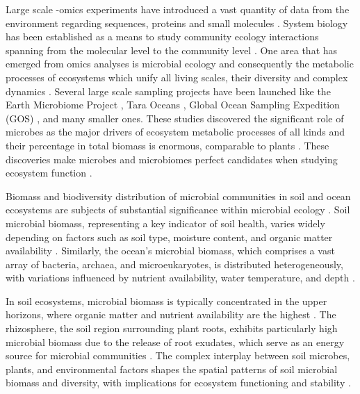 Large scale -omics experiments have introduced a vast quantity of data from the
environment regarding sequences, proteins and small molecules \parencite{shaffer2022Standardized}.
System biology has been established as a means to study community ecology interactions spanning
from the molecular level to the community level \parencite{raes2008Molecular}.
One area that has emerged from omics analyses is microbial ecology and
consequently the metabolic processes of ecosystems \parencite{perez_garcia2016Metabolic}
which unify all living scales, their diversity and complex dynamics \parencite{smith2016Origin}.
Several large scale sampling projects have been launched like the Earth
Microbiome Project \parencite{thompson2017a-communal}, Tara Oceans \parencite{sunagawa2020tara},
Global Ocean Sampling Expedition (GOS) \parencite{Shibu2007}, and
many smaller ones. These studies discovered the significant role of microbes as the major drivers of ecosystem metabolic
processes of all kinds \parencite{falkowski2008microbial,hall2018understanding} and
their percentage in total biomass is enormous, comparable to plants \parencite{bar2018biomass}.
These discoveries make microbes and microbiomes perfect candidates when
studying ecosystem function \parencite{klitgord2011Ecosystems,widder2016Challenges}.

Biomass and biodiversity distribution of microbial communities in soil and ocean
ecosystems are subjects of substantial significance within microbial ecology \parencite{bar2018biomass}.
Soil microbial biomass, representing a key indicator of soil health, varies
widely depending on factors such as soil type, moisture content, and organic
matter availability \parencite{Crowther2019}. Similarly, the ocean's
microbial biomass, which comprises a vast array of bacteria, archaea, and
microeukaryotes, is distributed heterogeneously, with variations influenced by
nutrient availability, water temperature, and depth \parencite{loucaDecouplingFunctionTaxonomy2016}.

In soil ecosystems, microbial biomass is typically concentrated in the upper
horizons, where organic matter and nutrient availability are the highest \parencite{Anthony2023}.
The rhizosphere, the soil region surrounding plant roots, exhibits particularly
high microbial biomass due to the release of root exudates, which serve as an
energy source for microbial communities \parencite{beugnon2022Abiotic}. The complex
interplay between soil microbes, plants, and environmental factors shapes the
spatial patterns of soil microbial biomass and diversity, with implications for
ecosystem functioning and stability \parencite{philippot2024the-interplay}.

